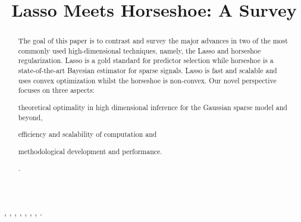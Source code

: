 \documentclass[sts,preprint]{imsart}
\begin{document}
\begin{frontmatter}

\title{Lasso Meets Horseshoe: A Survey}


\author{ }
\address{250 N. University St., West Lafayette, IN 47907. }
\vspace{-0.1in}
\author{ }
\address{1 University of Arkansas, Fayetteville, AR 72704. }
\author{ }
\address{5807 S. Woodlawn Ave., Chicago, IL 60637. }
\author{ }
\address{5807 S. Woodlawn Ave., Chicago, IL 60637. }



\begin{abstract}
The goal of this paper is to contrast and survey the major advances in two of the most commonly used high-dimensional techniques, namely, the Lasso and horseshoe regularization. Lasso is a gold standard for predictor selection while horseshoe is a state-of-the-art Bayesian estimator for sparse signals. Lasso is fast and scalable and uses convex optimization whilst the horseshoe is non-convex.  Our novel perspective focuses on three aspects: 
\begin{enumerate*}
  \item theoretical optimality in high dimensional inference for the Gaussian
    sparse model and beyond, 
  \item efficiency and scalability of computation and 
  \item methodological development and performance. 
\end{enumerate*}. 
\end{abstract}

\begin{keyword}[class=MSC]
 , , , , , , , .
\end{keyword}


\end{frontmatter}
\end{document}

